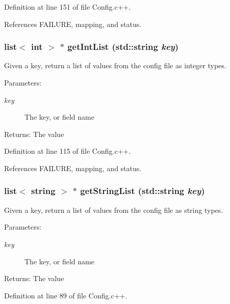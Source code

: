 Definition at line 151 of file Config.c++.

References FAILURE, mapping, and status.
\subsubsection{\setlength{\rightskip}{0pt plus 5cm}list$<$ int $>$ $\ast$ get\-Int\-List (std::string {\em key})}\label{classConfig_356a8e983980a51463fc92bd64682f41}


Given a key, return a list of values from the config file as integer types.

\begin{Desc}
\item[Parameters:]
\begin{description}
\item[{\em key}]The key, or field name \end{description}
\end{Desc}
\begin{Desc}
\item[Returns:]The value \end{Desc}


Definition at line 115 of file Config.c++.

References FAILURE, mapping, and status.
\subsubsection{\setlength{\rightskip}{0pt plus 5cm}list$<$ string $>$ $\ast$ get\-String\-List (std::string {\em key})}\label{classConfig_8c0eeb87c40f12b10be235fe5f52561e}


Given a key, return a list of values from the config file as string types.

\begin{Desc}
\item[Parameters:]
\begin{description}
\item[{\em key}]The key, or field name \end{description}
\end{Desc}
\begin{Desc}
\item[Returns:]The value \end{Desc}


Definition at line 89 of file Config.c++.

